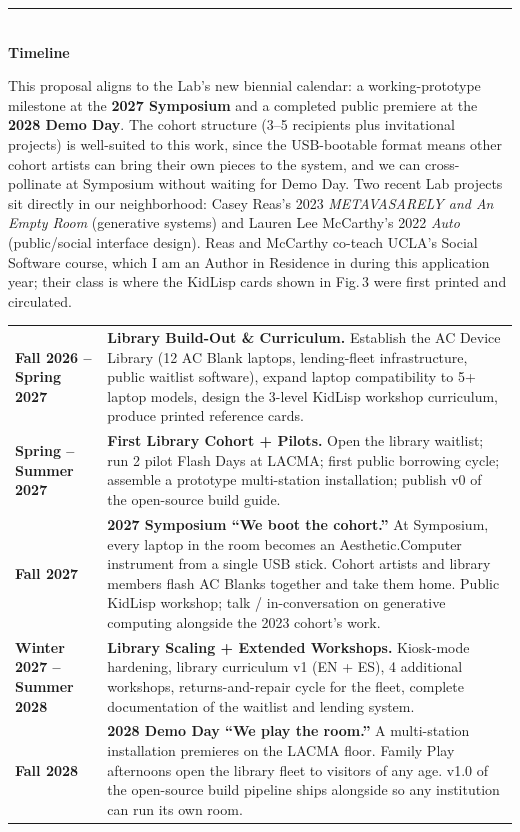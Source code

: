 \documentclass[12pt,letterpaper]{article}
\newcommand{\ac}{Aesthetic{\color{acpink}.}Computer}
\newcommand{\achead}[1]{%
  \vspace{1.6em}%
  {\color{acpink}\noindent\rule{\textwidth}{1.5pt}}\\[0.4em]
  {\large\bfseries #1}%
  \vspace{0.4em}%
}
\begin{document}
\achead{Timeline}

This proposal aligns to the Lab's new biennial calendar: a working-prototype milestone at the \textbf{2027 Symposium} and a completed public premiere at the \textbf{2028 Demo Day}. The cohort structure (3--5 recipients plus invitational projects) is well-suited to this work, since the USB-bootable format means other cohort artists can bring their own pieces to the system, and we can cross-pollinate at Symposium without waiting for Demo Day. Two recent Lab projects sit directly in our neighborhood: Casey Reas's 2023 \textit{METAVASARELY and An Empty Room} (generative systems) and Lauren Lee McCarthy's 2022 \textit{Auto} (public/social interface design). Reas and McCarthy co-teach UCLA's Social Software course, which I am an Author in Residence in during this application year; their class is where the KidLisp cards shown in Fig.\,3 were first printed and circulated.

\renewcommand{\arraystretch}{1.4}
\begin{tabularx}{\textwidth}{@{}lX@{}}
  \textbf{Fall 2026 -- Spring 2027} & \textbf{Library Build-Out \& Curriculum.} Establish the AC Device Library (12 AC Blank laptops, lending-fleet infrastructure, public waitlist software), expand laptop compatibility to 5+ laptop models, design the 3-level KidLisp workshop curriculum, produce printed reference cards. \\
  \textbf{Spring -- Summer 2027} & \textbf{First Library Cohort + Pilots.} Open the library waitlist; run 2 pilot Flash Days at LACMA; first public borrowing cycle; assemble a prototype multi-station installation; publish v0 of the open-source build guide. \\
  \textbf{Fall 2027} & \textbf{2027 Symposium ``We boot the cohort.''} At Symposium, every laptop in the room becomes an \ac{} instrument from a single USB stick. Cohort artists and library members flash AC Blanks together and take them home. Public KidLisp workshop; talk / in-conversation on generative computing alongside the 2023 cohort's work. \\
  \textbf{Winter 2027 -- Summer 2028} & \textbf{Library Scaling + Extended Workshops.} Kiosk-mode hardening, library curriculum v1 (EN + ES), 4 additional workshops, returns-and-repair cycle for the fleet, complete documentation of the waitlist and lending system. \\
  \textbf{Fall 2028} & \textbf{2028 Demo Day ``We play the room.''} A multi-station installation premieres on the LACMA floor. Family Play afternoons open the library fleet to visitors of any age. v1.0 of the open-source build pipeline ships alongside so any institution can run its own room. \\
\end{tabularx}
\renewcommand{\arraystretch}{1.0}
\end{document}
